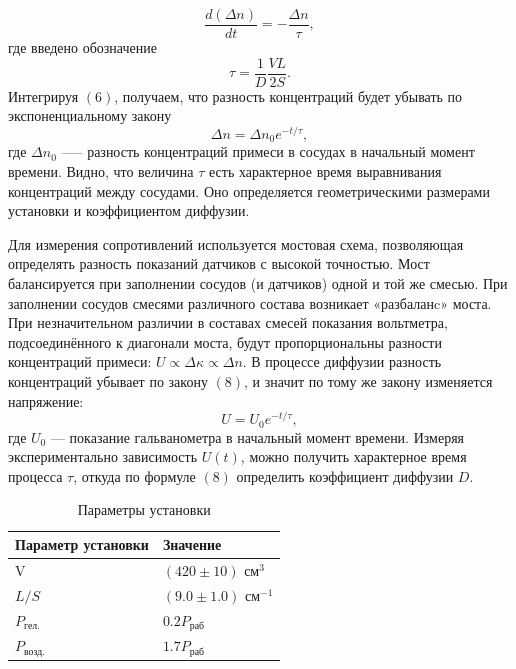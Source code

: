 \documentclass[12pt,a4paper]{article}
\begin{document}
	\begin{equation}
		\dfrac{d(\Delta n)}{dt} = - \dfrac{\Delta n}{\tau},
	\end{equation}
	где введено обозначение
	\begin{equation}
		\tau = \dfrac{1}{D} \dfrac{VL}{2S}.
	\end{equation}
	Интегрируя $(6)$, получаем, что разность концентраций будет убывать по экспоненциальному закону
	\begin{equation}
		\Delta n = \Delta n_0 e^{-t/\tau},
	\end{equation}
	где $\Delta n_0$ --— разность концентраций примеси в сосудах в начальный момент времени.
	Видно, что величина $\tau$ есть характерное время выравнивания концентраций между сосудами.
	Оно определяется геометрическими размерами установки и коэффициентом диффузии.
	
	Для измерения сопротивлений используется мостовая схема, позволяющая определять разность показаний датчиков с высокой точностью.
	Мост балансируется при заполнении сосудов (и датчиков) одной и той же смесью.
	При заполнении сосудов смесями различного состава возникает «разбаланc» моста.
	При незначительном различии в составах смесей показания вольтметра, подсоединённого к диагонали моста, будут пропорциональны разности концентраций примеси: $U \propto \Delta \kappa \propto \Delta n$.
	В процессе диффузии разность концентраций убывает по закону $(8)$, и значит по тому же закону изменяется напряжение: 
	\begin{equation}
		U = U_0 e^{-t/\tau},
	\end{equation}
	где $U_0$ --- показание гальванометра в начальный момент времени.
	Измеряя экспериментально зависимость $U(t)$, можно получить характерное время процесса $\tau$, откуда по формуле $(8)$ определить коэффициент диффузии $D$.


	\begin{table}[h]
		\centering
		\caption{Параметры установки}
		\label{tab:scheme}
		\footnotesize
		\begin{tabular}{ll}
			
			\toprule
			Параметр установки & Значение \\
			\midrule
			V & $(420\pm10) $ $\text{см}^3$ \\
			$L/S$ & $(9.0\pm1.0)$ $ \text{см}^{-1}$ \\
			$P_{\text{гел.}}$ & $0.2 P_{\text{раб}}$ \\
			$P_{\text{возд.}}$ & $1.7 P_{\text{раб}}$ \\
			\bottomrule
			
		\end{tabular}
		
	\end{table} 
\end{document}
